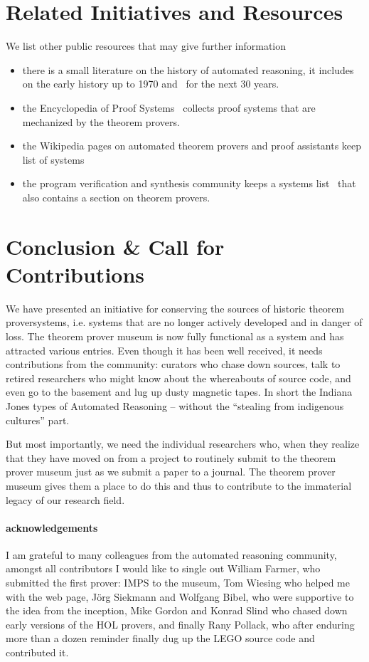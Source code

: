\documentclass{article}
\begin{document}
\section{Related Initiatives and Resources}
We list other public resources that may give further information
\begin{itemize}
\item there is a small literature on the history of automated reasoning, it
  includes~\cite{Bibel:ehpad07} on the early history up to 1970 and~\cite{RobVor:hoar01}
  for the next 30 years. 
\item the Encyclopedia of Proof Systems~\cite{Wolzenlogel-Paleo:teps17} collects proof
  systems that are mechanized by the theorem provers.
\item the Wikipedia pages on automated theorem provers and proof assistants keep list of systems
\item the program verification and synthesis community keeps a systems
  list~\cite{vsstp:on} that also contains a section on theorem provers.
\end{itemize}

\section{Conclusion \& Call for Contributions}\label{sec:concl}

We have presented an initiative for conserving the sources of historic theorem proversystems, i.e. systems that are no longer actively developed and in danger of loss. The
theorem prover museum is now fully functional as a system and has attracted various
entries. Even though it has been well received, it needs contributions from the community:
curators who chase down sources, talk to retired researchers who might know about the
whereabouts of source code, and even go to the basement and lug up dusty magnetic
tapes. In short the Indiana Jones types of Automated Reasoning -- without the ``stealing
from indigenous cultures'' part.

But most importantly, we need the individual researchers who, when they realize that they
have moved on from a project to routinely submit to the theorem prover museum just as we
submit a paper to a journal. The theorem prover museum gives them a place to do this and
thus to contribute to the immaterial legacy of our research field. 

\paragraph{acknowledgements}
I am grateful to many colleagues from the automated reasoning community, amongst all
contributors I would like to single out William Farmer, who submitted the first prover:
IMPS to the museum, Tom Wiesing who helped me with the web page, J\"org Siekmann and
Wolfgang Bibel, who were supportive to the idea from the inception, Mike Gordon and Konrad
Slind who chased down early versions of the HOL provers, and finally Rany Pollack, who
after enduring more than a dozen reminder finally dug up the LEGO source code and
contributed it.

\printbibliography
\end{document}
